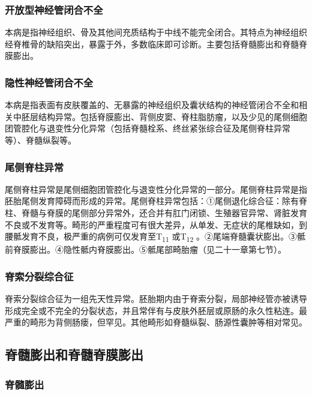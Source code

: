 \subsubsection{开放型神经管闭合不全}

本病是指神经组织、骨及其他间充质结构于中线不能完全闭合。其特点为神经组织经脊椎骨的缺陷突出，暴露于外，多数临床即可诊断。主要包括脊髓膨出和脊髓脊膜膨出。

\subsubsection{隐性神经管闭合不全}

本病是指表面有皮肤覆盖的、无暴露的神经组织及囊状结构的神经管闭合不全和相关中胚层结构异常。包括脊膜膨出、背侧皮窦、脊柱脂肪瘤，以及少见的尾侧细胞团管腔化与退变性分化异常（包括脊髓栓系、终丝紧张综合征及尾侧脊柱异常等）、脊髓纵裂等。

\subsubsection{尾侧脊柱异常}

尾侧脊柱异常是尾侧细胞团管腔化与退变性分化异常的一部分。尾侧脊柱异常是指胚胎尾侧发育障碍而形成的异常。尾侧脊柱异常包括：①尾侧退化综合征：除有脊柱、脊髓与脊膜的尾侧部分异常外，还合并有肛门闭锁、生殖器官异常、肾脏发育不良或不发育等。畸形的严重程度可有很大差异，从单发、无症状的尾椎缺如，到腰骶发育不良，极严重的病例可仅发育至T\textsubscript{11}
或T\textsubscript{12}
。②尾端脊髓囊状膨出。③骶前脊膜膨出。④隐性骶内脊膜膨出。⑤骶尾部畸胎瘤（见二十一章第七节）。

\subsubsection{脊索分裂综合征}

脊索分裂综合征为一组先天性异常。胚胎期内由于脊索分裂，局部神经管亦被诱导形成完全或不完全的分裂状态，并且常伴有与皮肤外胚层或原肠的永久性粘连。最严重的畸形为背侧肠瘘，但罕见。其他畸形如脊髓纵裂、肠源性囊肿等相对常见。

\subsection{脊髓膨出和脊髓脊膜膨出}

\subsubsection{脊髓膨出}

